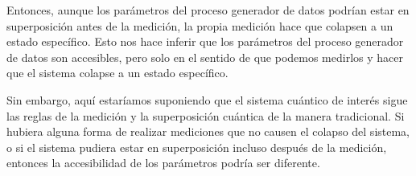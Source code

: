 \begin{problema}
\begin{sol}
        Entonces, aunque los parámetros del proceso generador de datos podrían estar en superposición antes de la medición, la propia medición hace que colapsen a un estado específico. Esto nos hace inferir que los parámetros del proceso generador de datos son accesibles, pero solo en el sentido de que podemos medirlos y hacer que el sistema colapse a un estado específico.\bigbreak 

        Sin embargo, aquí estaríamos suponiendo que el sistema cuántico de interés sigue las reglas de la medición y la superposición cuántica de la manera tradicional. Si hubiera alguna forma de realizar mediciones que no causen el colapso del sistema, o si el sistema pudiera estar en superposición incluso después de la medición, entonces la accesibilidad de los parámetros podría ser diferente.
    \end{sol}
\end{problema}

